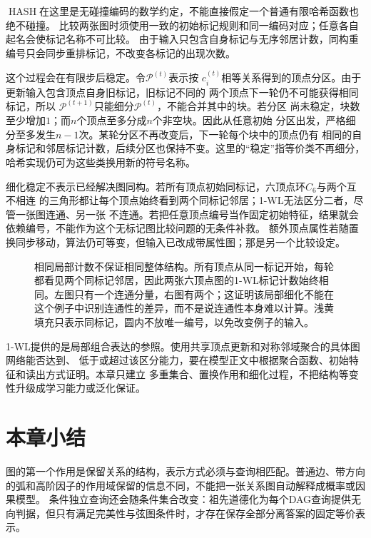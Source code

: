 \(\operatorname{HASH}\)在这里是无碰撞编码的数学约定，不能直接假定一个普通有限哈希函数也绝不碰撞。
比较两张图时须使用一致的初始标记规则和同一编码对应；任意各自起名会使标记名称不可比较。
由于输入只包含自身标记与无序邻居计数，同构重编号只会同步重排标记，不改变各标记的出现次数。

这个过程会在有限步后稳定。令\(\mathcal{P}^{(t)}\)表示按
\(c_i^{(t)}\)相等关系得到的顶点分区。由于更新输入包含顶点自身旧标记，旧标记不同的
两个顶点下一轮仍不可能获得相同标记，所以
\(\mathcal{P}^{(t+1)}\)只能细分\(\mathcal{P}^{(t)}\)，不能合并其中的块。若分区
尚未稳定，块数至少增加\(1\)；而\(n\)个顶点至多分成\(n\)个非空块。因此从任意初始
分区出发，严格细分至多发生\(n-1\)次。某轮分区不再改变后，下一轮每个块中的顶点仍有
相同的自身标记和邻居标记计数，后续分区也保持不变。这里的“稳定”指等价类不再细分，
哈希实现仍可为这些类换用新的符号名称。

细化稳定不表示已经解决图同构。若所有顶点初始同标记，六顶点环\(C_6\)与两个互不相连
的三角形都让每个顶点始终看到两个同标记邻居；1-WL无法区分二者，尽管一张图连通、另一张
不连通。若把任意顶点编号当作固定初始特征，结果就会依赖编号，不能作为这个无标记图比较问题的无条件补救。
额外顶点属性若随置换同步移动，算法仍可等变，但输入已改成带属性图；那是另一个比较设定。

\begin{figure}[htbp]
  \centering
  
  \caption{相同局部计数不保证相同整体结构。所有顶点从同一标记开始，每轮都看见两个同标记邻居，因此两张六顶点图的1-WL标记计数始终相同。左图只有一个连通分量，右图有两个；这证明该局部细化不能在这个例子中识别连通性的差异，而不是说连通性本身难以计算。浅黄填充只表示同标记，圆内不放唯一编号，以免改变例子的输入。}
  \label{fig:graph-theory-wl-local-ambiguity}
\end{figure}

1-WL提供的是局部组合表达的参照。使用共享顶点更新和对称邻域聚合的具体图网络能否达到、
低于或超过该区分能力，要在模型正文中根据聚合函数、初始特征和读出方式证明。本章只建立
多重集合、置换作用和细化过程，不把结构等变性升级成学习能力或泛化保证。

\section{本章小结}
\label{sec:graph-theory-summary}

图的第一个作用是保留关系的结构，表示方式必须与查询相匹配。普通边、带方向的弧和高阶因子的作用域保留的信息不同，不能把一张关系图自动解释成概率或因果模型。
条件独立查询还会随条件集合改变：祖先道德化为每个DAG查询提供无向判据，但只有满足完美性与弦图条件时，才存在保存全部分离答案的固定等价表示。

